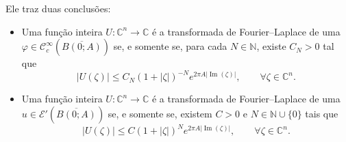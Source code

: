 \documentclass[../distribution_theory_notes.tex]{subfiles}
\begin{document}
\begin{theorem*}
	Ele traz duas conclusões:
	\begin{itemize}
		\item[(I)] Uma função inteira \(U:\mathbb{C}^n\to\mathbb{C}\) é a transformada de Fourier--Laplace de uma \(\varphi\in\mathcal{C}_c^\infty(\overline{B(0;A)})\) se, e somente se, para cada \(N\in\mathbb{N}\), existe \(C_N>0\) tal que
		      \[
			      |U(\zeta)|\leq C_N(1+|\zeta|)^{-N}e^{2\pi A|\operatorname{Im}(\zeta)|},
			      \qquad \forall \zeta\in\mathbb{C}^n.
		      \]
		\item[(II)] Uma função inteira \(U:\mathbb{C}^n\to\mathbb{C}\) é a transformada de Fourier--Laplace de uma \(u\in\mathcal{E}'(\overline{B(0;A)})\) se, e somente se, existem \(C>0\) e \(N\in\mathbb{N}\cup\{0\}\) tais que
		      \[
			      |U(\zeta)|\leq C(1+|\zeta|)^Ne^{2\pi A|\operatorname{Im}(\zeta)|},
			      \qquad \forall \zeta\in\mathbb{C}^n.
		      \]
	\end{itemize}
\end{theorem*}
\end{document}
